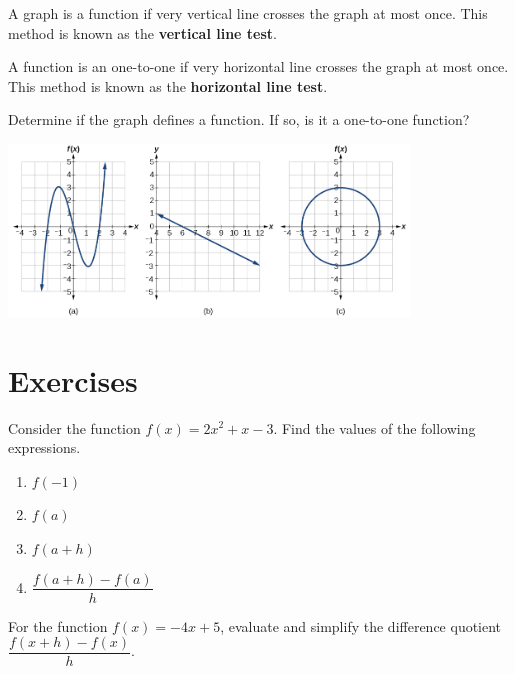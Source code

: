 \begin{howto}
  A graph is a function if very vertical line crosses the graph at most once. This method is known as the \textbf{vertical line test}.

A function is an one-to-one if very horizontal line crosses the graph at most once. This method is known as the \textbf{horizontal line test}.
\end{howto}

\begin{example}
  Determine if the graph defines a function. If so, is it a one-to-one function?
  \begin{center}
  \includegraphics[width=0.8\textwidth]{figs/cubic-line-circle.jpg}
  \end{center}
\end{example}

\newpage
\section*{Exercises}

\begin{exercise}
  Consider the function $f(x)=2x^2+x-3$. Find the values of the following expressions.

\begin{enumerate}[fourcol]
  \item \(f(-1)\)
  \item \(f(a)\)
  \item \(f(a+h)\)
  \item \(\dfrac{f(a+h)-f(a)}{h}\)
\end{enumerate}
\end{exercise}
\vspace*{2\baselineskip}

\begin{exercise}
  For the function $f(x)=-4x+5$, evaluate and simplify the difference quotient $\dfrac{f(x+h)-f(x)}{h}$.
\end{exercise}
\vspace*{2\baselineskip}

